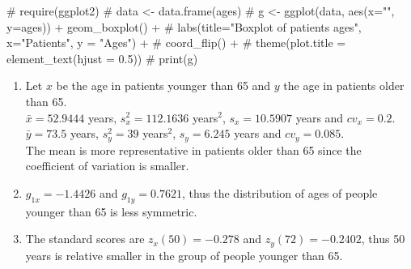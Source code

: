 \documentclass[
  a4paper,
]{scrreport}
\newenvironment{Shaded}{\begin{snugshade}}{\end{snugshade}}
\newcommand{\CommentTok}[1]{\textcolor[rgb]{0.37,0.37,0.37}{#1}}
\theoremstyle{definition}
\theoremstyle{remark}
\begin{document}
\begin{tcolorbox}
\begin{figure}[H]
{}

\end{figure}

\begin{Shaded}
\begin{Highlighting}[]
\CommentTok{\# require(ggplot2)}
\CommentTok{\# data \textless{}{-} data.frame(ages)}
\CommentTok{\# g \textless{}{-} ggplot(data, aes(x="", y=ages)) + geom\_boxplot() + }
\CommentTok{\#   labs(title="Boxplot of patients ages", x="Patients", y = "Ages") + }
\CommentTok{\#   coord\_flip() + }
\CommentTok{\#   theme(plot.title = element\_text(hjust = 0.5))}
\CommentTok{\# print(g)}
\end{Highlighting}
\end{Shaded}

\begin{enumerate}
\def\labelenumi{\alph{enumi}.}
\item
  Let \(x\) be the age in patients younger than 65 and \(y\) the age in
  patients older than 65.\\
  \(\bar x=52.9444\) years, \(s_x^2=112.1636\) years\(^2\),
  \(s_x=10.5907\) years and \(cv_x=0.2\).\\
  \(\bar y=73.5\) years, \(s_y^2=39\) years\(^2\), \(s_y=6.245\) years
  and \(cv_y=0.085\).\\
  The mean is more representative in patients older than 65 since the
  coefficient of variation is smaller.
\item
  \(g_{1x}=-1.4426\) and \(g_{1y}=0.7621\), thus the distribution of
  ages of people younger than 65 is less symmetric.
\item
  The standard scores are \(z_x(50)=-0.278\) and \(z_y(72)=-0.2402\),
  thus 50 years is relative smaller in the group of people younger than
  65.
\end{enumerate}

\end{tcolorbox}
\end{document}
